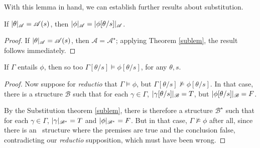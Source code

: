 With this lemma in hand, we can establish further results about substitution.
\begin{theorem}
	If $|\theta|_{\mathscr{A}} = \mathscr{A}(s)$, then $|\phi|_{\mathscr{A}} = |\phi[\theta/s]|_{\mathscr{A}}$. \begin{proof}
		If $|\theta|_{\mathscr{A}} = \mathscr{A}(s)$, then $\mathscr{A}=\mathscr{A}^{\star}$; applying Theorem \ref{sublem}, the result follows immediately.
	\end{proof}
\end{theorem}
\begin{theorem}\label{substitution} If $\Gamma$ entails $\phi$, then so too $\Gamma[\theta/s] \vDash \phi[\theta/s]$, for any $\theta, s$.
\begin{proof}
	Now suppose for \emph{reductio} that $\Gamma \vDash \phi$, but $\Gamma[\theta/s] \nvDash \phi[\theta/s]$. In that case, there is a structure $\mathscr{B}$ such that for each $\gamma \in \Gamma$, $|\gamma[\theta/s]|_{\mathscr{B}}=T$, but $|\phi[\theta/s]|_{\mathscr{B}}=F$.

	By the Substitution theorem \ref{sublem}, there is therefore a structure $\mathscr{B}^{\star}$ such that for each $\gamma \in \Gamma$, $|\gamma|_{\mathscr{B^{\star}}}=T$ and $|\phi|_{\mathscr{B^{\star}}}=F$. But in that case, $\Gamma \nvDash \phi$ after all, since there is an \lone\ structure where the premises are true and the conclusion false, contradicting our \emph{reductio} supposition, which must have been wrong.
\end{proof}
\end{theorem}
